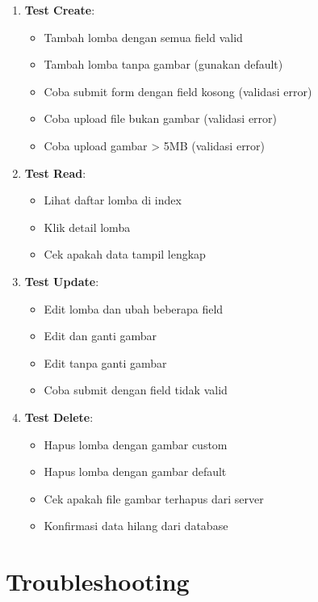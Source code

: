 \documentclass[12pt,a4paper]{article}
\begin{document}
\begin{enumerate}
    \item \textbf{Test Create}:
    \begin{itemize}
        \item Tambah lomba dengan semua field valid
        \item Tambah lomba tanpa gambar (gunakan default)
        \item Coba submit form dengan field kosong (validasi error)
        \item Coba upload file bukan gambar (validasi error)
        \item Coba upload gambar > 5MB (validasi error)
    \end{itemize}
    
    \item \textbf{Test Read}:
    \begin{itemize}
        \item Lihat daftar lomba di index
        \item Klik detail lomba
        \item Cek apakah data tampil lengkap
    \end{itemize}
    
    \item \textbf{Test Update}:
    \begin{itemize}
        \item Edit lomba dan ubah beberapa field
        \item Edit dan ganti gambar
        \item Edit tanpa ganti gambar
        \item Coba submit dengan field tidak valid
    \end{itemize}
    
    \item \textbf{Test Delete}:
    \begin{itemize}
        \item Hapus lomba dengan gambar custom
        \item Hapus lomba dengan gambar default
        \item Cek apakah file gambar terhapus dari server
        \item Konfirmasi data hilang dari database
    \end{itemize}
\end{enumerate}

\section{Troubleshooting}
\end{document}
